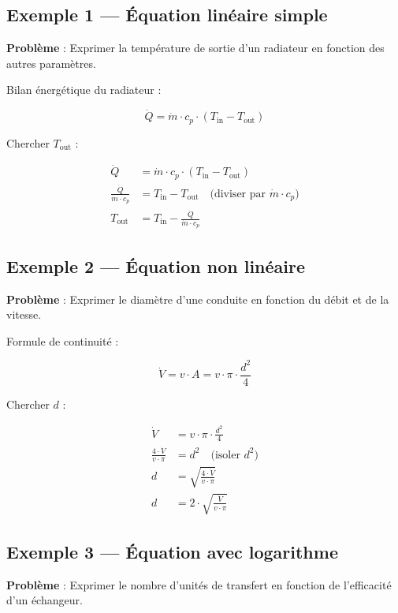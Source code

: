 \subsection{Exemple 1 — Équation linéaire simple}

\textbf{Problème} : Exprimer la température de sortie d'un radiateur en fonction des autres
paramètres.

Bilan énergétique du radiateur :

\[
  \dot{Q} = \dot{m} \cdot c_p \cdot (T_{\mathrm{in}} - T_{\mathrm{out}})
\]

Chercher $T_{\mathrm{out}}$ :

\begin{align*}
  \dot{Q} &= \dot{m} \cdot c_p \cdot (T_{\mathrm{in}} - T_{\mathrm{out}}) \\
  \frac{\dot{Q}}{\dot{m} \cdot c_p} &= T_{\mathrm{in}} - T_{\mathrm{out}} \quad \text{(diviser par
  $\dot{m} \cdot c_p$)} \\
  T_{\mathrm{out}} &= T_{\mathrm{in}} - \frac{\dot{Q}}{\dot{m} \cdot c_p}
\end{align*}

\subsection{Exemple 2 — Équation non linéaire}

\textbf{Problème} : Exprimer le diamètre d'une conduite en fonction du débit et de la vitesse.

Formule de continuité :

\[
  \dot{V} = v \cdot A = v \cdot \pi \cdot \frac{d^2}{4}
\]

Chercher $d$ :

\begin{align*}
  \dot{V} &= v \cdot \pi \cdot \frac{d^2}{4} \\
  \frac{4 \cdot \dot{V}}{v \cdot \pi} &= d^2 \quad \text{(isoler $d^2$)} \\
  d &= \sqrt{\frac{4 \cdot \dot{V}}{v \cdot \pi}} \\
  d &= 2 \cdot \sqrt{\frac{\dot{V}}{v \cdot \pi}}
\end{align*}

\subsection{Exemple 3 — Équation avec logarithme}

\textbf{Problème} : Exprimer le nombre d'unités de transfert en fonction de l'efficacité d'un
échangeur.

